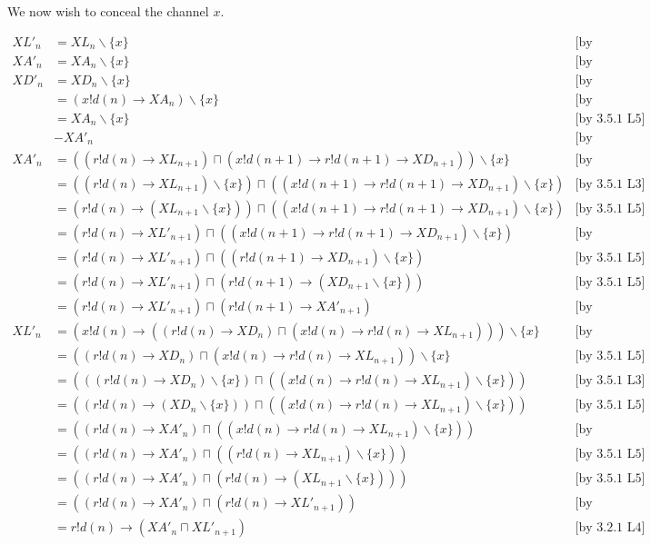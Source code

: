 \documentclass[a4paper, 10pt]{article}
\newcommand{\how}[1]{\text{[#1]}}
\newcommand{\bx}{\backslash \{x\}}
\begin{document}
We now wish to conceal the channel $x$.

\begin{align*}
  XL'_n &= XL_n \bx & \how{by definition} \\
  XA'_n &= XA_n \bx &\how{by definition} \\
  XD'_n &= XD_n \bx  & \how{by definition}\\
  &= (x!d(n) \to XA_n) \bx & \how{by expansion} \\
  &= XA_n \bx & \how{by 3.5.1 L5} \\
  &- XA'_n & \how{by substitution} \\
  XA'_n &= ((r!d(n) \to XL_{n+1}) \sqcap
  (x!d(n+1) \to r!d(n+1) \to XD_{n+1})) \bx
  &\how{by definition} \\
  &= ((r!d(n) \to XL_{n+1}) \bx) \sqcap ((x!d(n+1) \to r!d(n+1) \to
  XD_{n+1}) \bx) &\how{by 3.5.1 L3} \\
  &= (r!d(n) \to (XL_{n+1} \bx)) \sqcap ((x!d(n+1) \to r!d(n+1) \to
  XD_{n+1}) \bx) &\how{by 3.5.1 L5} \\
  &= (r!d(n) \to XL'_{n+1}) \sqcap ((x!d(n+1) \to r!d(n+1) \to
  XD_{n+1}) \bx) &\how{by substitution} \\
  &= (r!d(n) \to XL'_{n+1}) \sqcap ((r!d(n+1) \to
  XD_{n+1}) \bx) &\how{by 3.5.1 L5} \\
  &= (r!d(n) \to XL'_{n+1}) \sqcap (r!d(n+1) \to
  (XD_{n+1} \bx)) &\how{by 3.5.1 L5} \\
  &= (r!d(n) \to XL'_{n+1}) \sqcap (r!d(n+1) \to
  XA'_{n+1}) &\how{by substitution} \\
  XL'_n &= (x!d(n) \to ((r!d(n) \to XD_n) \sqcap (x!d(n) \to r!d(n)
  \to XL_{n+1}))) \bx & \how{by definition} \\
  &= ((r!d(n) \to XD_n) \sqcap (x!d(n) \to r!d(n)
  \to XL_{n+1})) \bx & \how{by 3.5.1 L5} \\
  &= (((r!d(n) \to XD_n) \bx) \sqcap ((x!d(n) \to r!d(n) \to XL_{n+1})
  \bx)) & \how{by 3.5.1 L3} \\
  &= ((r!d(n) \to (XD_n \bx)) \sqcap ((x!d(n) \to r!d(n) \to XL_{n+1})
  \bx)) & \how{by 3.5.1 L5} \\
  &= ((r!d(n) \to XA'_n) \sqcap ((x!d(n) \to r!d(n) \to XL_{n+1})
  \bx)) & \how{by substitution} \\
  &= ((r!d(n) \to XA'_n) \sqcap ((r!d(n) \to XL_{n+1})
  \bx)) & \how{by 3.5.1 L5} \\
  &= ((r!d(n) \to XA'_n) \sqcap (r!d(n) \to (XL_{n+1}
  \bx))) & \how{by 3.5.1 L5} \\
  &= ((r!d(n) \to XA'_n) \sqcap (r!d(n) \to XL'_{n+1})) & \how{by
    substitution} \\
  &= r!d(n) \to (XA'_n \sqcap XL'_{n+1}) & \how{by 3.2.1 L4} \\
\end{align*}
\end{document}
